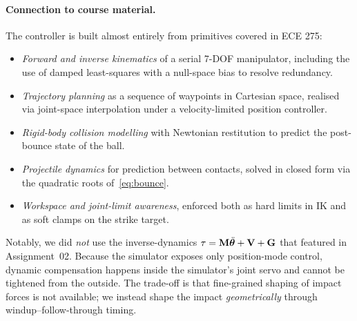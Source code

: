 \paragraph{Connection to course material.}
The controller is built almost entirely from primitives covered in
ECE 275:
\begin{itemize}
  \item \emph{Forward and inverse kinematics} of a serial 7-DOF
        manipulator, including the use of damped least-squares with a
        null-space bias to resolve redundancy.
  \item \emph{Trajectory planning} as a sequence of waypoints in
        Cartesian space, realised via joint-space interpolation under a
        velocity-limited position controller.
  \item \emph{Rigid-body collision modelling} with Newtonian
        restitution to predict the post-bounce state of the ball.
  \item \emph{Projectile dynamics} for prediction between contacts,
        solved in closed form via the quadratic roots
        of~\eqref{eq:bounce}.
  \item \emph{Workspace and joint-limit awareness}, enforced both as
        hard limits in IK and as soft clamps on the strike target.
\end{itemize}
Notably, we did \emph{not} use the inverse-dynamics
$\tau = \mathbf{M}\ddot{\boldsymbol{\theta}}+\mathbf{V}+\mathbf{G}$ that featured in
Assignment~02. Because the simulator exposes only position-mode
control, dynamic compensation happens inside the simulator's joint
servo and cannot be tightened from the outside. The trade-off is that
fine-grained shaping of impact forces is not available; we instead
shape the impact \emph{geometrically} through windup--follow-through
timing.

